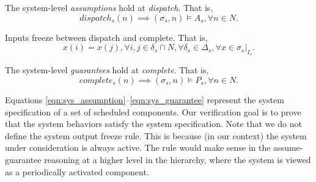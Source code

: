 The system-level \emph{assumptions} hold at \emph{dispatch}. That is,
\begin{equation} 
\label{eqn:sys_assumption}
	dispatch_s(n) \implies (\sigma_s, n) \models A_s, \forall n\in N.
\end{equation}

Inputs freeze between dispatch and complete. That is,
\begin{equation} 
\label{eqn:sys_inputfreeze}
	x(i) = x(j), \forall i,j\in \delta_s \cap N, \forall \delta_s \in \Delta_s, \forall x \in \sigma_s|_{I_s}.
\end{equation}

The system-level \emph{guarantees} hold at \emph{complete}. That is,
\begin{equation} 
\label{eqn:sys_guarantee}
	complete_s(n) \implies (\sigma_s, n) \models P_s, \forall n\in N.
\end{equation}

Equations \ref{eqn:sys_assumption}--\ref{eqn:sys_guarantee} represent the system specification of a set of scheduled components. 
Our verification goal is to prove that the system behaviors satisfy the system specification. 
Note that we do not define the system output freeze rule.
This is because (in our context) the system under consideration is always active. The rule would make sense in the assume-guarantee reasoning at a higher level in the hierarchy, where the system is viewed as a periodically activated component.%
